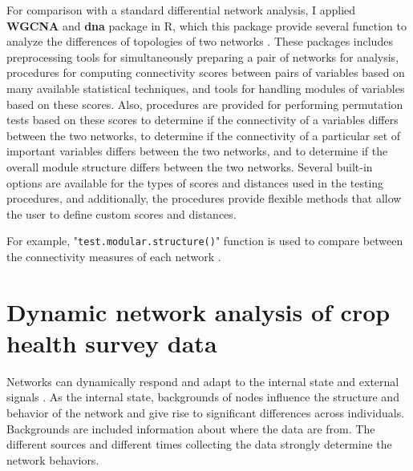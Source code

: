 For comparison with a standard differential network analysis, I applied \textbf{WGCNA}  and \textbf{dna}  package in R, which this package provide several function to analyze the differences of topologies of two networks . 
These packages includes preprocessing tools for simultaneously preparing a pair of networks for analysis, procedures for computing connectivity scores between pairs of variables based on many available statistical techniques, and tools for handling modules of variables based on these scores. Also, procedures are provided for performing permutation tests based on these scores to determine if the connectivity of a variables differs between the two networks, to determine if the connectivity of a particular set of important variables differs between the two networks, and to determine if the overall module structure differs between the two networks. Several built-in options are available for the types of scores and distances used in the testing procedures, and additionally, the procedures provide flexible methods that allow the user to define custom scores and distances.

For example, "\texttt{test.modular.structure()}" function is used to compare between the connectivity measures of each network . 



 

\section*{Dynamic network analysis of crop health survey data}
Networks can dynamically respond and adapt to the internal state and external signals . As the internal state, backgrounds of nodes influence the structure and behavior of the network and give rise to significant differences across individuals. Backgrounds are included information about where the data are from. The different sources and different times collecting the data strongly determine the network behaviors. 

